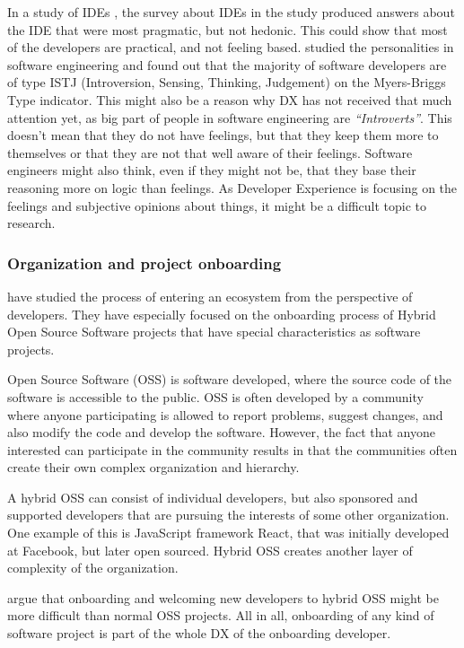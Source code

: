 \documentclass[english, 12pt, a4paper, sci, utf8, a-1b, online]{aaltothesis}
\begin{document}
In a study of IDEs \parencite{software-developers-as-users}, the survey about IDEs in the study produced answers about the IDE that were most pragmatic, but not hedonic. This could show that most of the developers are practical, and not feeling based. \textcite{personality-software} studied the personalities in software engineering and found out that the majority of software developers are of type ISTJ (Introversion, Sensing, Thinking, Judgement) on the Myers-Briggs Type indicator. This might also be a reason why DX has not received that much attention yet, as big part of people in software engineering are \textit{``Introverts''}.  This doesn't mean that they do not have feelings, but that they keep them more to themselves or that they are not that well aware of their feelings. Software engineers might also think, even if they might not be, that they base their reasoning more on logic than feelings. As Developer Experience is focusing on the feelings and subjective opinions about things, it might be a difficult topic to research.

\subsubsection{Organization and project onboarding}

\textcite{entering-an-ecosystem} have studied the process of entering an ecosystem from the perspective of developers. They have especially focused on the onboarding process of Hybrid Open Source Software projects that have special characteristics as software projects.

Open Source Software (OSS) is software developed, where the source code of the software is accessible to the public. OSS is often developed by a community where anyone participating is allowed to report problems, suggest changes, and also modify the code and develop the software. However, the fact that anyone interested can participate in the community results in that the communities often create their own complex organization and hierarchy.

A hybrid OSS can consist of individual developers, but also sponsored and supported developers that are pursuing the interests of some other organization. One example of this is JavaScript framework React, that was initially developed at Facebook, but later open sourced. Hybrid OSS creates another layer of complexity of the organization.

\textcite{entering-an-ecosystem} argue that onboarding and welcoming new developers to hybrid OSS might be more difficult than normal OSS projects. All in all, onboarding of any kind of software project is part of the whole DX of the onboarding developer.
\end{document}
